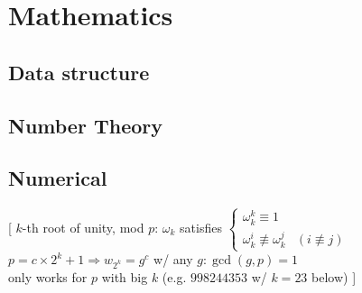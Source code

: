 \section{Mathematics}
\subsection{Data structure}

\subsection{Number Theory}

\subsection{Numerical}
[
	$k$-th root of unity, mod $p$: $\omega_k$ satisfies
	$\begin{cases}
		\omega_k^k \equiv 1 & \\ 
		\omega_k^i \not\equiv \omega_k^j & (i \not\equiv j)
	\end{cases}$\\
	$p=c \times 2^k+1 \Rightarrow w_{2^k}=g^c$ w/ any $g: \gcd(g, p)=1$\\
	only works for $p$ with big $k$ (e.g. $998244353$ w/ $k=23$ below)
]